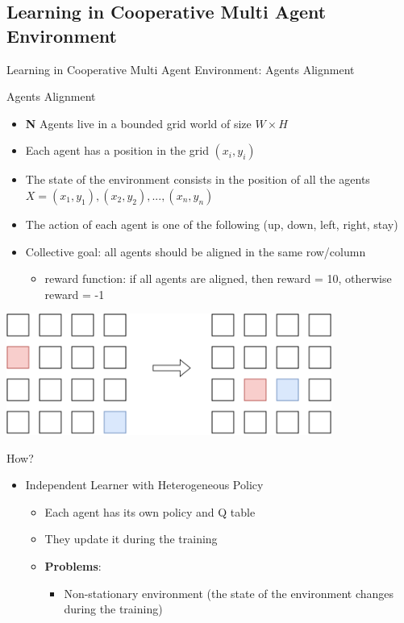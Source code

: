 \documentclass[presentation, 8pt]{beamer}\mode<presentation>{\usetheme{AMSBolognaFC}}
\begin{document}
\subsection{Learning in Cooperative Multi Agent Environment}
\begin{frame}[allowframebreaks]{Learning in Cooperative Multi Agent Environment: Agents Alignment}
\begin{exampleblock}{Agents Alignment}
	\begin{itemize}
		\item \textbf{N} Agents live in a bounded grid world of size $W \times H$
		\item Each agent has a position in the grid $(x_i, y_i)$
		\item The state of the environment consists in the position of all the agents $X = {(x_1, y_1), (x_2, y_2), ..., (x_n, y_n)}$
		\item The action of each agent is one of the following (up, down, left, right, stay)
		\item Collective goal: all agents should be aligned in the same row/column
		\begin{itemize}
			\item reward function: if all agents are aligned, then reward = 10, otherwise reward = -1
		\end{itemize}
	\end{itemize}
\end{exampleblock}
\centering
\includegraphics[width=0.8\textwidth]{img/agent-modelling.pdf}
\begin{alertblock}{How?}
	\begin{itemize}
		\item Independent Learner with Heterogeneous Policy
		\begin{itemize}
			\item Each agent has its own policy and Q table
			\item They update it during the training
			\item \textbf{Problems}:
			\begin{itemize}
				\item Non-stationary environment (the state of the environment changes during the training)

\end{itemize}
\end{itemize}
\end{itemize}
\end{alertblock}
\end{frame}
\end{document}
